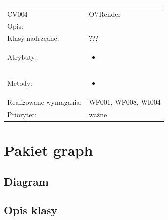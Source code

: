 \documentclass[a4paper,10pt]{article}
\begin{document}
\begin{center}
\begin{longtable}{|m{3cm}|m{9cm}|}
\multicolumn{2}{c}{} \\
 \hline

CV004 & OVRender \\ \hline
Opis: &     \\ \hline
Klasy nadrzędne: &  ???   \\ \hline
Atrybuty: & \begin{itemize}
 \item 
\end{itemize}
 \\ \hline
Metody: & \begin{itemize}
 \item 
\end{itemize}
  \\ \hline
Realizowane wymagania: & WF001, WF008, WI004 \\ \hline
Priorytet: & ważne  \\ \hline



\end{longtable}

\end{center}

\section{Pakiet graph}

\subsection{Diagram}


\subsection{Opis klasy}
\end{document}
